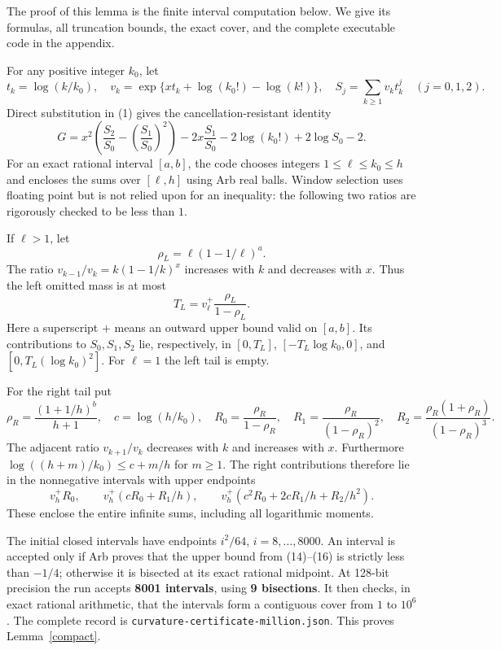 \documentclass[10pt]{article}
\begin{document}
The proof of this lemma is the finite interval computation below.
We give its formulas, all truncation bounds, the exact cover, and
the complete executable code in the appendix.

For any positive integer $k_0$, let
\[
 t_k=\log(k/k_0),\quad
 v_k=\exp\{xt_k+\log(k_0!)-\log(k!)\},\quad
 S_j=\sum_{k\ge1}v_kt_k^j\quad(j=0,1,2).
\]
Direct substitution in (1) gives the cancellation-resistant identity
\[
 G=x^2\left(\frac{S_2}{S_0}-\left(\frac{S_1}{S_0}\right)^2\right)
 -2x\frac{S_1}{S_0}-2\log(k_0!)+2\log S_0-2.           \tag{14}
\]
For an exact rational interval $[a,b]$, the code chooses integers
$1\le\ell\le k_0\le h$ and encloses the sums over $[\ell,h]$
using Arb real balls. Window selection uses floating point but is
not relied upon for an inequality: the following two ratios are
rigorously checked to be less than $1$.

If $\ell>1$, let
\[
 \rho_L=\ell(1-1/\ell)^a.
\]
The ratio $v_{k-1}/v_k=k(1-1/k)^x$ increases with $k$ and
decreases with $x$. Thus the left omitted mass is at most
\[
 T_L=v_\ell^{+}\frac{\rho_L}{1-\rho_L}.                 \tag{15}
\]
Here a superscript $+$ means an outward upper bound valid on $[a,b]$.
Its contributions to $S_0,S_1,S_2$ lie, respectively, in
$[0,T_L]$, $[-T_L\log k_0,0]$, and $[0,T_L(\log k_0)^2]$.
For $\ell=1$ the left tail is empty.

For the right tail put
\[
 \rho_R=\frac{(1+1/h)^b}{h+1},\quad c=\log(h/k_0),\quad
 R_0=\frac{\rho_R}{1-\rho_R},\quad
 R_1=\frac{\rho_R}{(1-\rho_R)^2},\quad
 R_2=\frac{\rho_R(1+\rho_R)}{(1-\rho_R)^3}.
\]
The adjacent ratio $v_{k+1}/v_k$ decreases with $k$ and increases
with $x$. Furthermore $\log((h+m)/k_0)\le c+m/h$ for $m\ge1$.
The right contributions therefore lie in the nonnegative intervals
with upper endpoints
\[
 v_h^+R_0,\qquad v_h^+(cR_0+R_1/h),\qquad
 v_h^+(c^2R_0+2cR_1/h+R_2/h^2).                        \tag{16}
\]
These enclose the entire infinite sums, including all logarithmic moments.

The initial closed intervals have endpoints
$i^2/64$, $i=8,\ldots,8000$. An interval is accepted only if
Arb proves that the upper bound from (14)--(16) is strictly less
than $-1/4$; otherwise it is bisected at its exact rational midpoint.
At 128-bit precision the run accepts \textbf{8001 intervals},
using \textbf{9 bisections}. It then checks, in exact rational
arithmetic, that the intervals form a contiguous cover from $1$ to $10^6$.
The complete record is \texttt{curvature-certificate-million.json}.
This proves Lemma~\ref{compact}.
\end{document}
